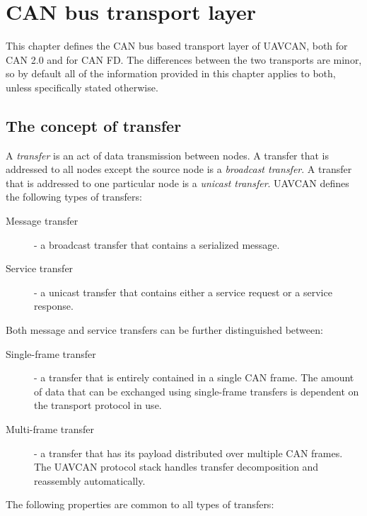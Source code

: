 \chapter{CAN bus transport layer}\label{sec:can_bus_transport_layer}

This chapter defines the CAN bus based transport layer of UAVCAN,
both for CAN 2.0 and for CAN FD.
The differences between the two transports are minor,
so by default all of the information provided in this chapter applies to both,
unless specifically stated otherwise.

\section{The concept of transfer}

A \emph{transfer} is an act of data transmission between nodes.
A transfer that is addressed to all nodes except the source node is a \emph{broadcast transfer}.
A transfer that is addressed to one particular node is a \emph{unicast transfer}.
UAVCAN defines the following types of transfers:

\begin{description}
    \item[Message transfer] - a broadcast transfer that contains a serialized message.
    \item[Service transfer] - a unicast transfer that contains either a service request or a service response.
\end{description}

Both message and service transfers can be further distinguished between:

\begin{description}
    \item[Single-frame transfer] - a transfer that is entirely contained in a single CAN frame.
    The amount of data that can be exchanged using single-frame transfers is dependent on the transport protocol in use.

    \item[Multi-frame transfer] - a transfer that has its payload distributed over multiple CAN frames.
    The UAVCAN protocol stack handles transfer decomposition and reassembly automatically.
\end{description}

The following properties are common to all types of transfers:

